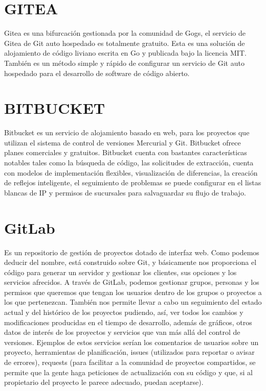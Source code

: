 \documentclass[12pt,letterpaper]{article}
\begin{document}
\section{GITEA}
Gitea es una bifurcación gestionada por la comunidad de Gogs, el servicio de Gitea de Git auto hospedado es totalmente gratuito. Esta es una solución de alojamiento de código liviano escrita en Go y publicada bajo la licencia MIT.
También es un método simple y rápido de configurar un servicio de Git auto hospedado para el desarrollo de software de código abierto.



\section{BITBUCKET}
Bitbucket es un servicio de alojamiento basado en web, para los proyectos que utilizan el sistema de control de versiones Mercurial y Git. Bitbucket ofrece planes comerciales y gratuitos.
Bitbucket cuenta con bastantes características notables tales como la búsqueda de código, las solicitudes de extracción, cuenta con modelos de implementación flexibles, visualización de diferencias, la creación de reflejos inteligente, el seguimiento de problemas se puede configurar en el listas blancas de IP y permisos de sucursales para salvaguardar su flujo de trabajo.


\section{GitLab}
Es un repositorio de gestión de proyectos dotado de interfaz web. Como podemos deducir del nombre, está construido sobre Git, y básicamente nos proporciona el código para generar un servidor y gestionar los clientes, sus opciones y los servicios afrecidos.
A través de GitLab, podemos gestionar grupos, personas y los permisos que queremos que tengan los usuarios dentro de los grupos o proyectos a los que pertenezcan. También nos permite llevar a cabo un seguimiento del estado actual y del histórico de los proyectos pudiendo, así, ver todos los cambios y modificaciones producidas en el tiempo de desarrollo, además de gráficos, otros datos de interés de los proyectos y servicios que van más allá del control de versiones. Ejemplos de estos servicios serían los comentarios de usuarios sobre un proyecto, herramientas de planificación, issues (utilizados para reportar o avisar de errores), requests (para facilitar a la comunidad de proyectos compartidos, se permite que la gente haga peticiones de actualización con su código y que, si al propietario del proyecto le parece adecuado, puedan aceptarse). 
\end{document}
